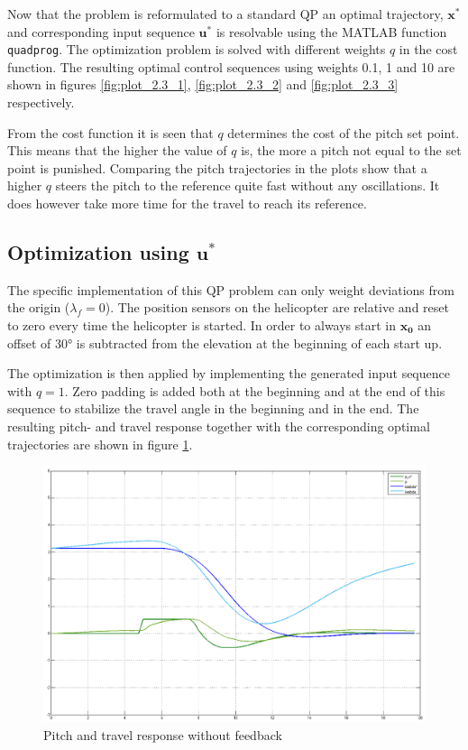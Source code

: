 \documentclass[a4paper, 12pt]{article}\usepackage[utf8]{inputenc}
\begin{document}
Now that the problem is reformulated to a standard QP an optimal trajectory, $\boldsymbol{x}^{*}$ and corresponding input sequence $\boldsymbol{u}^{*}$ is resolvable using the MATLAB function \texttt{quadprog}. The optimization problem is solved with different weights $q$ in the cost function. The resulting optimal control sequences using weights 0.1, 1 and 10 are shown in figures \ref{fig:plot_2.3_1}, \ref{fig:plot_2.3_2} and \ref{fig:plot_2.3_3} respectively.

From the cost function it is seen that $q$ determines the cost of the pitch set point. This means that the higher the value of $q$ is, the more a pitch not equal to the set point is punished. Comparing the pitch trajectories in the plots show that a higher $q$ steers the pitch to the reference quite fast without any oscillations. It does however take more time for the travel to reach its reference.

\subsection{Optimization using $\boldsymbol{u}^{*}$} \label{2.4}
The specific implementation of this QP problem can only weight deviations from the origin ($ \lambda_f = 0 $). The position sensors on the helicopter are relative and reset to zero every time the helicopter is started. In order to always start in $\boldsymbol{x_0}$ an offset of \ang{30} is subtracted from the elevation at the beginning of each start up.

The optimization is then applied by implementing the generated input sequence with $q = 1$. Zero padding is added both at the beginning and at the end of this sequence to stabilize the travel angle in the beginning and in the end. The resulting pitch- and travel response together with the corresponding optimal trajectories are shown in figure \ref{fig:plot_2.4}.

\begin{figure}[h!]
    \centering
    \includegraphics[width=130mm]{Part2/pitch+travel_plot_without_feedback.PNG}
    \caption{Pitch and travel response without feedback}
    \label{fig:plot_2.4}
\end{figure}
\end{document}
